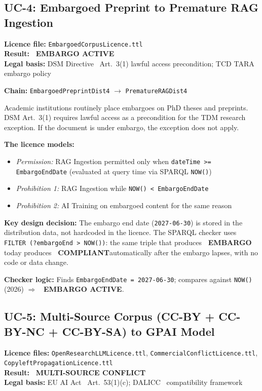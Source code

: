 \documentclass[12pt,a4paper]{article}
\newcommand{\compliant}{\textcolor{compliant}{\textbf{\checkmark\ COMPLIANT}}}
\newcommand{\violated}[1]{\textcolor{violation}{\textbf{\texttimes\ #1}}}
\begin{document}
\subsection{UC-4: Embargoed Preprint to Premature RAG Ingestion}
\textbf{Licence file:} \texttt{EmbargoedCorpusLicence.ttl}\\[2pt]
\textbf{Result:} \violated{EMBARGO ACTIVE}\\[4pt]
\textbf{Legal basis:} DSM Directive~\cite{dsm2019} Art.\ 3(1) lawful access precondition; TCD TARA embargo policy

\textbf{Chain:} \texttt{EmbargoedPreprintDist4} $\rightarrow$ \texttt{PrematureRAGDist4}

Academic institutions routinely place embargoes on PhD theses and preprints. DSM Art.\ 3(1) requires lawful access as a precondition for the TDM research exception. If the document is under embargo, the exception does not apply.

\textbf{The licence models:}
\begin{itemize}[noitemsep]
  \item \emph{Permission:} RAG Ingestion permitted only when \texttt{dateTime >= EmbargoEndDate} (evaluated at query time via SPARQL \texttt{NOW()})
  \item \emph{Prohibition 1:} RAG Ingestion while \texttt{NOW() < EmbargoEndDate}
  \item \emph{Prohibition 2:} AI Training on embargoed content for the same reason
\end{itemize}

\textbf{Key design decision:} The embargo end date (\texttt{2027-06-30}) is stored in the distribution data, not hardcoded in the licence. The SPARQL checker uses \texttt{FILTER (?embargoEnd > NOW())}: the same triple that produces \violated{EMBARGO} today produces \compliant automatically after the embargo lapses, with no code or data change.

\textbf{Checker logic:} Finds \texttt{EmbargoEndDate = 2027-06-30}; compares against \texttt{NOW()} (2026) $\Rightarrow$ \violated{EMBARGO ACTIVE}.

\subsection{UC-5: Multi-Source Corpus (CC-BY + CC-BY-NC + CC-BY-SA) to GPAI Model}
\textbf{Licence files:} \texttt{OpenResearchLLMLicence.ttl}, \texttt{CommercialConflictLicence.ttl}, \texttt{CopyleftPropagationLicence.ttl}\\[2pt]
\textbf{Result:} \violated{MULTI-SOURCE CONFLICT}\\[4pt]
\textbf{Legal basis:} EU AI Act~\cite{euaiact2024} Art.\ 53(1)(c); DALICC~\cite{dalicc} compatibility framework
\end{document}
